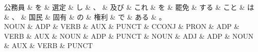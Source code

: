 \documentclass[tikz,border=5pt]{standalone}
\begin{document}
\normalsize
\begin{dependency}[edge unit distance=12.0pt]
    \begin{deptext}[column sep=1em]
        公務員 \& を \& 選定 \& し \& 、 \& 及び \& これ \& を \& 罷免 \& する \& こと \& は \& 、 \& 国民 \& 固有 \& の \& 権利 \& で \& ある \& 。\\
        NOUN \& ADP \& VERB \& AUX \& PUNCT \& CCONJ \& PRON \& ADP \& VERB \& AUX \& NOUN \& ADP \& PUNCT \& NOUN \& ADJ \& ADP \& NOUN \& AUX \& VERB \& PUNCT\\
    \end{deptext}
\end{dependency}
\end{document}
